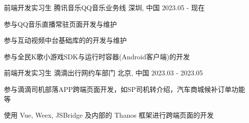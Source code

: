 

\begin{cventries}
    \cventry
    {前端开发实习生} %
    {腾讯音乐\hspace{2mm}QQ音乐业务线} %
    {深圳, 中国} %
    {2023.05 - 现在} %
    {
        \begin{cvitems} %
            \item {参与QQ音乐直播常驻页面开发与维护}
            \item {参与互动视频中台基础库的的开发与维护}
            \item {参与全民K歌小游戏SDK与运行时容器(Android客户端)的开发}
        \end{cvitems}
    }

    \cventry
    {前端开发实习生} %
    {滴滴出行\hspace{2mm}网约车部门} %
    {北京, 中国} %
    {2023.03 - 2023.05} %
    {
        \begin{cvitems} %
            \item {参与滴滴司机部落APP跨端页面开发，如SP司机转介绍，汽车商城候补订单功能等}
            \item {使用 Vue, Weex, JSBridge 及内部的 Thanos 框架进行跨端页面的开发}
        \end{cvitems}
    }
\end{cventries}

